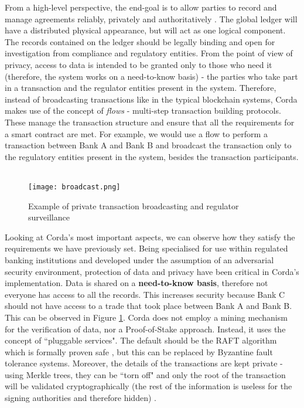 \documentclass[12pt,twoside]{article}
\begin{document}
From a high-level perspective, the end-goal is to allow parties to record and manage agreements reliably, privately and authoritatively \cite{Corda:IP}. The global ledger will have a distributed physical appearance, but will act as one logical component. The records contained on the ledger should be legally binding and open for investigation from compliance and regulatory entities. From the point of view of privacy, access to data is intended to be granted only to those who need it (therefore, the system works on a need-to-know basis) - the parties who take part in a transaction and the regulator entities present in the system. Therefore, instead of broadcasting transactions like in the typical blockchain systems, Corda makes use of the concept of \textit{flows} - multi-step transaction building protocols. These manage the transaction structure and ensure that all the requirements for a smart contract are met. For example, we would use a flow to perform a transaction between Bank A and Bank B and broadcast the transaction only to the regulatory entities present in the system, besides the transaction participants.
\\ \\
\begin{figure}[!htb]
\centering
\texttt{[image: broadcast.png]}
\caption{Example of private transaction broadcasting and regulator surveillance}
\centering
\label{fig:broadcast}
\end{figure}
Looking at Corda's most important aspects, we can observe how they satisfy the requirements we have previously set. Being specialised for use within regulated banking institutions and developed under the assumption of an adversarial security environment, protection of data and privacy have been critical in Corda's implementation. Data is shared on a \textbf{need-to-know basis}, therefore not everyone has access to all the records. This increases security because Bank C should not have access to a trade that took place between Bank A and Bank B. This can be observed in Figure \ref{fig:broadcast}. Corda does not employ a mining mechanism for the verification of data, nor a Proof-of-Stake approach. Instead, it uses the concept of ``pluggable services". The default should be the RAFT algorithm which is formally proven safe \cite{raft}, but this can be replaced by Byzantine fault tolerance systems. Moreover, the details of the transactions are kept private - using Merkle trees, they can be ``torn off" and only the root of the transaction will be validated cryptographically (the rest of the information is useless for the signing authorities and therefore hidden) \cite{Corda:TP}. 
\end{document}
